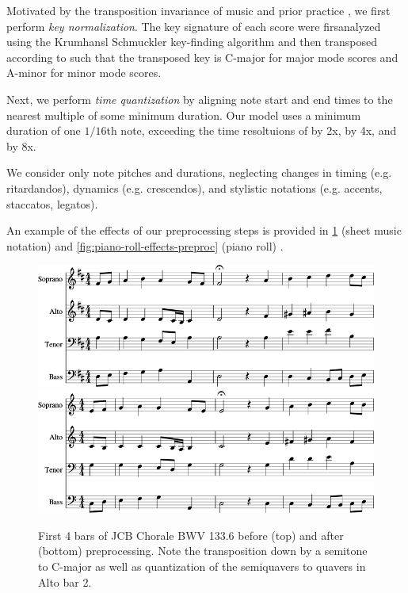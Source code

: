 Motivated by the transposition invariance of music and prior practice
\citep{mozer1994neural} \citep{Eck2002} \citep{franklin2004recurrent}
\citep{franklin2005jazz}, we first perform \emph{key normalization}.
The key signature of each score were firsanalyzed using the Krumhansl
Schmuckler key-finding algorithm \citep{krumhansl2001cognitive} and then
transposed according to  such that the transposed key is
C-major for major mode scores and A-minor for minor mode scores.

Next, we perform \emph{time quantization} by aligning note start and end times
to the nearest multiple of some minimum duration. Our model uses a minimum
duration of one $1/16$th note, exceeding the time resoltuions of
\citep{Boulanger-Lewandowski2012} \citep{Eck2002} by 2x, \citep{hild1991harmonet}
by 4x, and \citep{bellgard1994harmonizing} by 8x.

We consider only note pitches and durations, neglecting changes in timing
(e.g. ritardandos), dynamics (e.g. crescendos), and stylistic notations (e.g.
accents, staccatos, legatos).

An example of the effects of our preprocessing steps is provided in
\cref{fig:score-effects-preproc} (sheet music notation) and
\cref{fig:piano-roll-effects-preproc} (piano roll) .

\begin{figure}[htbp]
    \centering
    \includegraphics[width=0.8\linewidth]{bwv133-6-original-score-1.png}
    \vspace{1cm}
    \includegraphics[width=0.8\linewidth]{bwv133-6-preproc-score-1.png}
    \caption{First 4 bars of JCB Chorale BWV 133.6 before (top) and after (bottom) preprocessing. Note
    the transposition down by a semitone to C-major as well as quantization of the
    semiquavers to quavers in Alto bar 2.}
    \label{fig:score-effects-preproc}
\end{figure}

